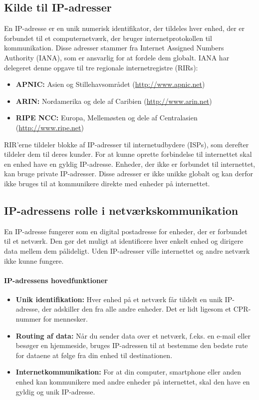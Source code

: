 \subsection{Kilde til IP-adresser}
En IP-adresse er en unik numerisk identifikator, der tildeles hver enhed, der er forbundet til et computernetværk, der bruger internetprotokollen til kommunikation. Disse adresser stammer fra Internet Assigned Numbers Authority (IANA), som er ansvarlig for at fordele dem globalt. IANA har delegeret denne opgave til tre regionale internetregistre (RIRs):
\begin{itemize}
	\item \textbf{APNIC:} Asien og Stillehavsområdet (\url{http://www.apnic.net})
	\item \textbf{ARIN:} Nordamerika og dele af Caribien (\url{http://www.arin.net})
	\item \textbf{RIPE NCC:} Europa, Mellemøsten og dele af Centralasien (\url{http://www.ripe.net})
\end{itemize}
RIR'erne tildeler blokke af IP-adresser til internetudbydere (ISPs), som derefter tildeler dem til deres kunder. For at kunne oprette forbindelse til internettet skal en enhed have en gyldig IP-adresse. Enheder, der ikke er forbundet til internettet, kan bruge private IP-adresser. Disse adresser er ikke unikke globalt og kan derfor ikke bruges til at kommunikere direkte med enheder på internettet.

\subsection{IP-adressens rolle i netværkskommunikation}
En IP-adresse fungerer som en digital postadresse for enheder, der er forbundet til et netværk. Den gør det muligt at identificere hver enkelt enhed og dirigere data mellem dem pålideligt. Uden IP-adresser ville internettet og andre netværk ikke kunne fungere.

\paragraph{IP-adressens hovedfunktioner}
\begin{itemize}
	\item \textbf{Unik identifikation:} Hver enhed på et netværk får tildelt en unik IP-adresse, der adskiller den fra alle andre enheder. Det er lidt ligesom et CPR-nummer for mennesker.
	\item \textbf{Routing af data:} Når du sender data over et netværk, f.eks. en e-mail eller besøger en hjemmeside, bruges IP-adressen til at bestemme den bedste rute for dataene at følge fra din enhed til destinationen.
	\item \textbf{Internetkommunikation:} For at din computer, smartphone eller anden enhed kan kommunikere med andre enheder på internettet, skal den have en gyldig og unik IP-adresse.
\end{itemize}

